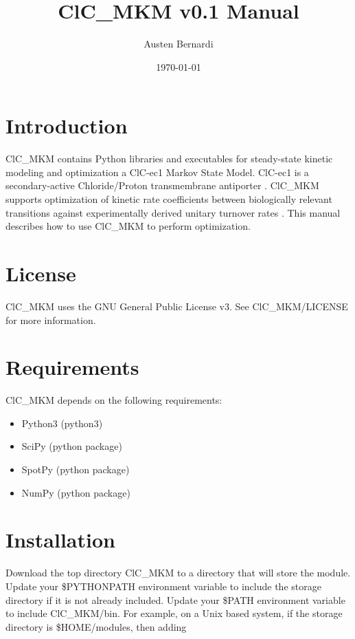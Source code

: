 \documentclass[12pt]{article}
\title{ClC\_MKM v0.1 Manual}
\author{Austen Bernardi}
\date{\today}
\newcommand{\parameters}[1]{{\fontfamily{pcr}\selectfont#1}}
\begin{document}
\maketitle{}

\tableofcontents
\clearpage
\newpage

\section{Introduction}

ClC\_MKM contains Python libraries and executables for steady-state kinetic modeling and optimization a ClC-ec1 Markov State Model. ClC-ec1 is a secondary-active Chloride/Proton transmembrane antiporter \cite{mayes2018multiscale}. ClC\_MKM supports optimization of kinetic rate coefficients between biologically relevant transitions against experimentally derived unitary turnover rates \cite{lim2009intracellular}. This manual describes how to use ClC\_MKM to perform optimization.

\section{License}
ClC\_MKM uses the GNU General Public License v3.  See \parameters{ClC\_MKM/LICENSE} for more information.

\section{Requirements}
ClC\_MKM depends on the following requirements:

\begin{itemize}
\item Python3 (python3)
\item SciPy (python package)
\item SpotPy (python package)
\item NumPy (python package)
\end{itemize}

\section{Installation}
Download the top directory \parameters{ClC\_MKM} to a directory that will store the module. Update your \parameters{\$PYTHONPATH} environment variable to include the storage directory if it is not already included. Update your \parameters{\$PATH} environment variable to include \parameters{ClC\_MKM/bin}. For example, on a Unix based system, if the storage directory is \parameters{\$HOME/modules}, then adding \\
\end{document}
